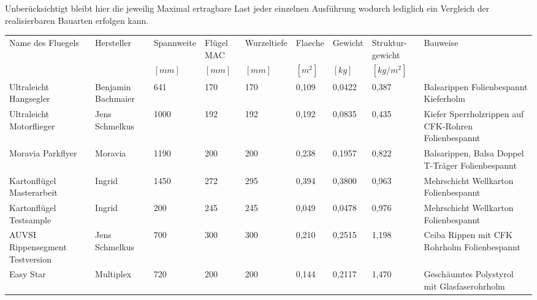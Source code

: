 Unberücksichtigt bleibt hier die jeweilig Maximal ertragbare Last jeder einzelnen Ausführung wodurch lediglich ein Vergleich der realisierbaren Bauarten erfolgen kann.
\begin{table}
\centering
\begin{adjustbox}{angle=90}
\begin{tabular}{|p{2cm}|p{2.5cm}|l|l|l|l|l|p{2cm}|p{4cm}|}
\hline
Name des Fluegels              & Hersteller         & Spannweite & Flügel MAC & Wurzeltiefe & Flaeche & Gewicht & Struktur- gewicht & Bauweise \\
& & $[mm]$ & $[mm]$ & $[mm]$ & $[m^{2}]$  & $[kg]$ & $[kg/m^{2}]$ & \\ \hline
Ultraleicht Hangsegler         & Benjamin Bachmaier & 641             & 170              & 170              & 0,109         & 0,0422       & 0,387                    & Balsarippen Folienbespannt Kieferholm \\\hline
Ultraleicht Motorflieger       & Jens \linebreak Schmelkus     & 1000            & 192              & 192              & 0,192         &  0,0835       & 0,435                    & Kiefer Sperrholzrippen auf CFK-Rohren Folienbespannt  \\\hline
Moravia Parkflyer              & Moravia            & 1190            & 200              & 200              & 0,238         &  0,1957       & 0,822                    & Balsarippen, Balsa Doppel T-Träger Folienbespannt         \\\hline
Kartonflügel Masterarbeit     & Ingrid             & 1450            & 272              & 295              & 0,394         &  0,3800       & 0,963                    & Mehrschicht Wellkarton Folienbespannt                            \\\hline
Kartonflügel Testsample       & Ingrid             & 200             & 245              & 245              & 0,049         &  0,0478       & 0,976                    & Mehrschicht Wellkarton Folienbespannt                          \\\hline
AUVSI Rippensegment Testversion & Jens \linebreak Schmelkus     & 700             & 300              & 300              & 0,210         &  0,2515       & 1,198                    & Ceiba Rippen mit CFK Rohrholm Folienbespannt                     \\\hline
Easy Star                      & Multiplex          & 720             & 200              & 200              & 0,144         & 0,2117       & 1,470                    & Geschäumtes Polystyrol mit Glasfaserohrholm                     \\\hline

\end{tabular}
\end{adjustbox}
\end{table}
